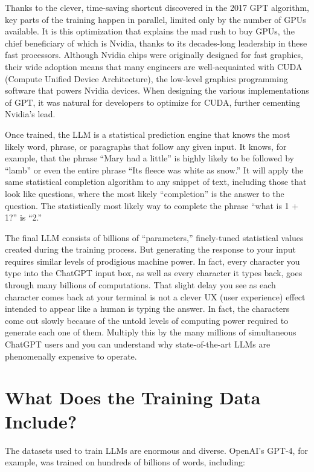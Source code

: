 \documentclass[
  Letterpaper,
]{scrbook}
\begin{document}
Thanks to the clever, time-saving shortcut discovered in the 2017 GPT
algorithm, key parts of the training happen in parallel, limited only by
the number of GPUs available. It is this optimization that explains the
mad rush to buy GPUs, the chief beneficiary of which is Nvidia, thanks
to its decades-long leadership in these fast processors. Although Nvidia
chips were originally designed for fast graphics, their wide adoption
means that many engineers are well-acquainted with CUDA (Compute Unified
Device Architecture), the low-level graphics programming software that
powers Nvidia devices. When designing the various implementations of
GPT, it was natural for developers to optimize for CUDA, further
cementing Nvidia's lead.

Once trained, the LLM is a statistical prediction engine that knows the
most likely word, phrase, or paragraphs that follow any given input. It
knows, for example, that the phrase ``Mary had a little'' is highly
likely to be followed by ``lamb'' or even the entire phrase ``Its fleece
was white as snow.'' It will apply the same statistical completion
algorithm to any snippet of text, including those that look like
questions, where the most likely ``completion'' is the answer to the
question. The statistically most likely way to complete the phrase
``what is 1 + 1?'' is ``2.''

The final LLM consists of billions of ``parameters,'' finely-tuned
statistical values created during the training process. But generating
the response to your input requires similar levels of prodigious machine
power. In fact, every character you type into the ChatGPT input box, as
well as every character it types back, goes through many billions of
computations. That slight delay you see as each character comes back at
your terminal is not a clever UX (user experience) effect intended to
appear like a human is typing the answer. In fact, the characters come
out slowly because of the untold levels of computing power required to
generate each one of them. Multiply this by the many millions of
simultaneous ChatGPT users and you can understand why state-of-the-art
LLMs are phenomenally expensive to operate.

\section{What Does the Training Data
Include?}\label{what-does-the-training-data-include}

The datasets used to train LLMs are enormous and diverse. OpenAI's
GPT-4, for example, was trained on hundreds of billions of words,
including:
\end{document}

